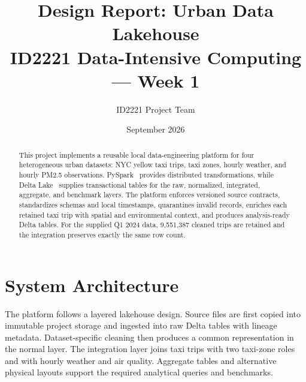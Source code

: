 \documentclass[10pt,a4paper]{article}
\title{\vspace{-1.2cm}\textbf{Design Report: Urban Data Lakehouse}\\
\large ID2221 Data-Intensive Computing --- Week 1}
\author{ID2221 Project Team}
\date{September 2026}
\begin{document}
\maketitle
\vspace{-0.8cm}

\begin{abstract}
This project implements a reusable local data-engineering platform for four
heterogeneous urban datasets: NYC yellow taxi trips, taxi zones, hourly
weather, and hourly PM2.5 observations. PySpark~\cite{sparktypes} provides
distributed transformations, while Delta Lake~\cite{delta} supplies
transactional tables for the raw,
normalized, integrated, aggregate, and benchmark layers. The platform
enforces versioned source contracts, standardizes schemas and local timestamps,
quarantines invalid records, enriches each retained taxi trip with spatial and
environmental context, and produces analysis-ready Delta tables. For the
supplied Q1 2024 data, 9,551,387 cleaned trips are retained and the integration
preserves exactly the same row count.
\end{abstract}

\section{System Architecture}

The platform follows a layered lakehouse design. Source files are first copied
into immutable project storage and ingested into raw Delta tables with lineage
metadata. Dataset-specific cleaning then produces a common representation in
the normal layer. The integration layer joins taxi trips with two taxi-zone
roles and with hourly weather and air quality. Aggregate tables and alternative
physical layouts support the required analytical queries and benchmarks.

\begin{center}
\end{center}
\end{document}
